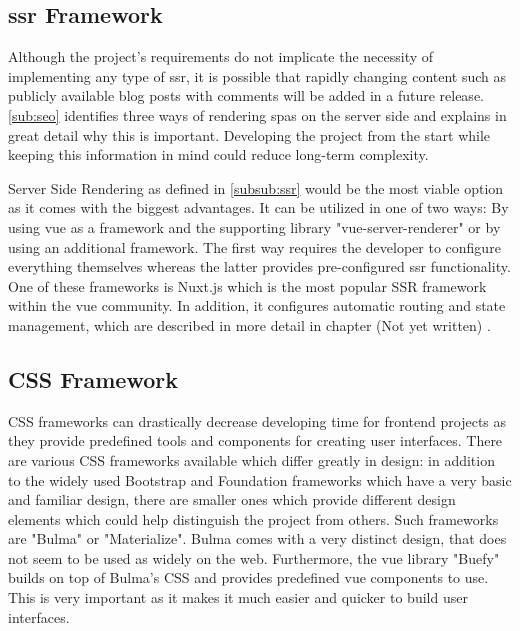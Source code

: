 \subsection{\acrshort{ssr} Framework}
Although the project's requirements do not implicate the necessity of implementing any type of \acrfull{ssr}, it is possible that rapidly changing content such as publicly available blog posts with comments will be added in a future release. \autoref{sub:seo} identifies three ways of rendering \acrshort{spa}s on the server side and explains in great detail why this is important. Developing the project from the start while keeping this information in mind could reduce long-term complexity. 

Server Side Rendering as defined in \autoref{subsub:ssr} would be the most viable option as it comes with the biggest advantages. It can be utilized in one of two ways: By using vue as a framework and the supporting library "vue-server-renderer" or by using an additional framework. The first way requires the developer to configure everything themselves whereas the latter provides pre-configured \acrshort{ssr} functionality. One of these frameworks is Nuxt.js which is the most  popular SSR framework within the vue community. In addition, it configures automatic routing and state management, which are described in more detail in chapter (Not yet written) . 

\subsection{CSS Framework}
CSS frameworks can drastically decrease developing time for frontend projects as they provide predefined tools and components for creating user interfaces. There are various CSS frameworks available which differ greatly in design: in addition to the widely used Bootstrap and Foundation frameworks which have a very basic and familiar design, there are smaller ones which provide different design elements which could help distinguish the project from others. Such frameworks are "Bulma" or "Materialize". Bulma comes with a very distinct design, that does not seem to be used as widely on the web. Furthermore, the vue library "Buefy" builds on top of Bulma's CSS and provides predefined vue components to use. This is very important as it makes it much easier and quicker to build user interfaces.


